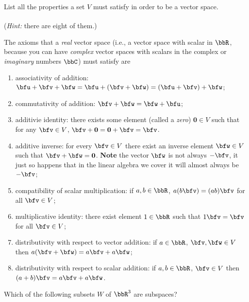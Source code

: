 \begin{questions}
  \question[12] List all the properties a set $V$ must
  satisfy in order to be a vector space.
  \\\\
  (\emph{Hint:} there are eight of them.)
  \begin{solution}
    The axioms that a \emph{real} vector space (i.e., a vector space with
    scalar in $\bbR$, because you can have \emph{complex} vector spaces
    with scalars in the complex or \emph{imaginary} numbers $\bbC$) must
    satisfy are
    \begin{enumerate}
    \item associativity of addition:
      $\bfu+\bfv+\bfw=\bfu+(\bfv+\bfw)=(\bfu+\bfv)+\bfw$;
    \item commutativity of addition: $\bfv+\bfw=\bfw+\bfu$;
    \item additivie identity: there exists some element (called a
      \emph{zero}) $\mathbf{0}\in V$ such that for any $\bfv\in V$,
      $\bfv+\mathbf{0}=\mathbf{0}+\bfv=\bfv$.
    \item additive inverse: for every $\bfv\in V$ there exist an inverse
      element $\bfw\in V$ such that $\bfv+\bfw=\mathbf{0}$. \textbf{Note}
      the vector $\bfw$ is not always $-\bfv$, it just so happens that in
      the linear algebra we cover it will almost always be $-\bfv$;
    \item compatibility of scalar multiplication: if $a,b\in\bbR$,
      $a(b\bfv)=(ab)\bfv$ for all $\bfv\in V$;
    \item multiplicative identity: there exist element $1\in\bbR$ such that
      $1\bfv=\bfv$ for all $\bfv\in V$;
    \item distributivity with respect to vector addition: if $a\in\bbR$,
      $\bfv,\bfw\in V$ then $a(\bfv+\bfw)=a\bfv+a\bfw$;
    \item distributivity with respect to scalar addition: if $a,b\in\bbR$,
      $\bfv\in V$ then $(a+b)\bfv=a\bfv+a\bfw$.
    \end{enumerate}
  \end{solution}
  \question Which of the following subsets $W$ of $\bbR^3$ are subspaces?
\end{questions}
